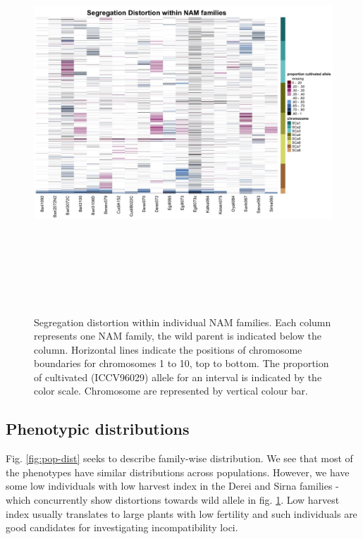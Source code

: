 \begin{figure}
    \centering
    \includegraphics[height = 15cm, width = 15cm]{tex/chickpea/Segdis.jpeg}
    \caption{ Segregation distortion within individual NAM families. Each column represents one NAM family, the wild parent is indicated below the column. Horizontal lines indicate the positions of chromosome boundaries for chromosomes 1 to 10, top to bottom. The proportion of cultivated (ICCV96029) allele for an interval is indicated by the color scale. Chromosome are represented by vertical colour bar.}
    \label{fig:seg-dis}
\end{figure}

\subsection{Phenotypic distributions}
Fig. \ref{fig:pop-dist} seeks to describe family-wise distribution. We see that most of the phenotypes have similar distributions across populations. However, we have some low individuals with low harvest index in the Derei and Sirna families - which concurrently show distortions towards wild allele in fig. \ref{fig:seg-dis}. Low harvest index usually translates to large plants with low fertility and such individuals are good candidates for investigating incompatibility loci. 

